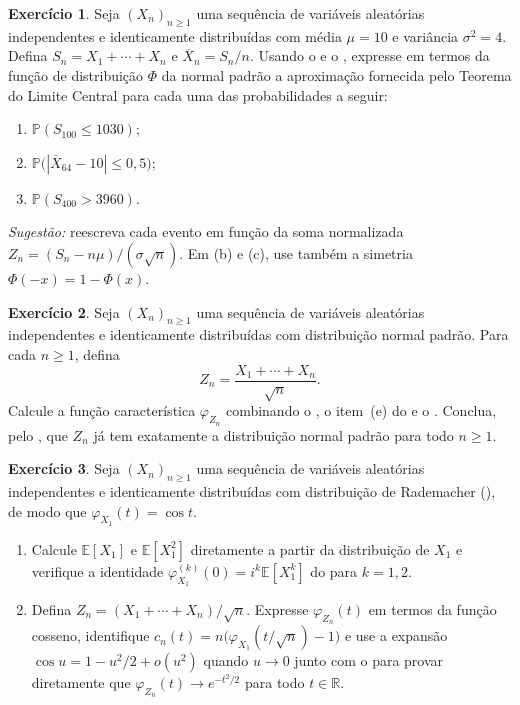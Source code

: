 \documentclass[12pt,portuguese]{article}
\theoremstyle{definition}
\theoremstyle{plainexercise}
\newtheorem{exercise}{Exercício}
\theoremstyle{starredexercise}
\theoremstyle{definition}
\begin{document}
\begin{exercise}\label{exercise:tlc-imediato-padronizacao}
Seja $(X_n)_{n\geqslant1}$ uma sequência de variáveis aleatórias independentes e
identicamente distribuídas com média $\mu=10$ e variância $\sigma^2=4$. Defina
$S_n=X_1+\cdots+X_n$ e $\overline{X}_n=S_n/n$. Usando o  e
o , expresse em termos da
função de distribuição $\Phi$ da normal padrão a aproximação fornecida pelo
Teorema do Limite Central para cada uma das probabilidades a seguir:
\begin{enumerate}[label=(\alph*)]
\item $\mathbb{P}(S_{100}\leqslant 1030)$;
\item $\mathbb{P}\bigl(|\overline{X}_{64}-10|\leqslant 0{,}5\bigr)$;
\item $\mathbb{P}(S_{400}>3960)$.
\end{enumerate}

\noindent\emph{Sugestão:} reescreva cada evento em função da soma normalizada
$Z_n=(S_n-n\mu)/(\sigma\sqrt{n})$. Em (b) e (c), use também a simetria
$\Phi(-x)=1-\Phi(x)$.
\end{exercise}

\begin{exercise}\label{exercise:tlc-imediato-normais}
Seja $(X_n)_{n\geqslant1}$ uma sequência de variáveis aleatórias independentes e
identicamente distribuídas com distribuição normal padrão. Para cada
$n\geqslant1$, defina
\[
  Z_n=\frac{X_1+\cdots+X_n}{\sqrt{n}}.
\]
Calcule a função característica $\varphi_{Z_n}$ combinando o , o
item~(e) do  e o .
Conclua, pelo ,
que $Z_n$ já tem exatamente a distribuição normal padrão para todo
$n\geqslant1$.
\end{exercise}

\begin{exercise}\label{exercise:tlc-imediato-rademacher}
Seja $(X_n)_{n\geqslant1}$ uma sequência de variáveis aleatórias independentes e
identicamente distribuídas com distribuição de Rademacher (),
de modo que $\varphi_{X_1}(t)=\cos t$.
\begin{enumerate}[label=(\alph*)]
\item Calcule $\mathbb{E}[X_1]$ e $\mathbb{E}[X_1^2]$ diretamente a partir da
distribuição de $X_1$ e verifique a identidade
$\varphi_{X_1}^{(k)}(0)=i^k\mathbb{E}[X_1^k]$ do
 para $k=1,2$.
\item Defina $Z_n=(X_1+\cdots+X_n)/\sqrt{n}$. Expresse $\varphi_{Z_n}(t)$ em
termos da função cosseno, identifique
$c_n(t)=n\bigl(\varphi_{X_1}(t/\sqrt{n})-1\bigr)$ e use a expansão
$\cos u=1-u^2/2+o(u^2)$ quando $u\to0$ junto com o
 para provar diretamente que
$\varphi_{Z_n}(t)\to e^{-t^2/2}$ para todo $t\in\mathbb{R}$.
\end{enumerate}
\end{exercise}
\end{document}
